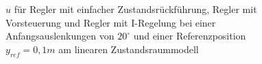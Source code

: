 \begin{figure}[H]
    \centering
    \caption[Reglervergleich für $u$ (linear)]{$u$ für Regler mit einfacher Zustandsrückführung, Regler mit Vorsteuerung und Regler mit I-Regelung bei einer Anfangsauslenkungen von $20^\circ$ und einer Referenzposition $y_{ref} = 0,1 m$ am linearen Zustandsraummodell}
    \label{fig:Bild27}
\end{figure}

